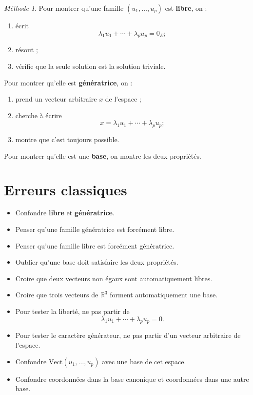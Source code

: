 \documentclass[11pt,a4paper]{article}
\theoremstyle{remark}
\newtheorem*{methode}{Méthode}
\newcommand{\R}{\mathbb{R}}
\newcommand{\Vect}{\mathrm{Vect}}
\begin{document}
\begin{methode}
Pour montrer qu’une famille \((u_1,\dots,u_p)\) est \textbf{libre}, on :
\begin{enumerate}
    \item écrit
    \[
    \lambda_1u_1+\cdots+\lambda_pu_p=0_E ;
    \]
    \item résout ;
    \item vérifie que la seule solution est la solution triviale.
\end{enumerate}

Pour montrer qu’elle est \textbf{génératrice}, on :
\begin{enumerate}
    \item prend un vecteur arbitraire \(x\) de l’espace ;
    \item cherche à écrire
    \[
    x=\lambda_1u_1+\cdots+\lambda_pu_p ;
    \]
    \item montre que c’est toujours possible.
\end{enumerate}

Pour montrer qu’elle est une \textbf{base}, on montre les deux propriétés.
\end{methode}

\section{Erreurs classiques}

\begin{itemize}
    \item Confondre \textbf{libre} et \textbf{génératrice}.
    \item Penser qu’une famille génératrice est forcément libre.
    \item Penser qu’une famille libre est forcément génératrice.
    \item Oublier qu’une base doit satisfaire les deux propriétés.
    \item Croire que deux vecteurs non égaux sont automatiquement libres.
    \item Croire que trois vecteurs de \(\R^3\) forment automatiquement une base.
    \item Pour tester la liberté, ne pas partir de
    \[
    \lambda_1u_1+\cdots+\lambda_pu_p=0.
    \]
    \item Pour tester le caractère générateur, ne pas partir d’un vecteur arbitraire de l’espace.
    \item Confondre \(\Vect(u_1,\dots,u_p)\) avec une base de cet espace.
    \item Confondre coordonnées dans la base canonique et coordonnées dans une autre base.
\end{itemize}
\end{document}
